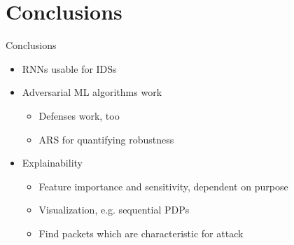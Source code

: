 \documentclass{beamer}
\begin{document}
\section{Conclusions}
\begin{frame}{Conclusions}
\begin{itemize}
\item RNNs usable for IDSs
\item Adversarial ML algorithms work
\begin{itemize}
\item Defenses work, too
\item ARS for quantifying robustness
\end{itemize}
\item Explainability
\begin{itemize}
\item Feature importance and sensitivity, dependent on purpose 
\item Visualization, e.g. sequential PDPs
\item Find packets which are characteristic for attack
\end{itemize}
\end{itemize}
\end{frame}
\makelastslide
\end{document}
